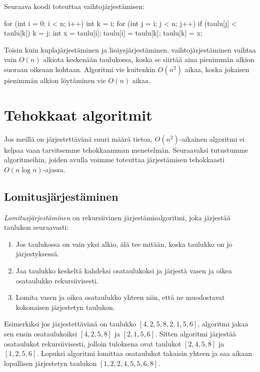 Seuraava koodi toteuttaa vaihtojärjestämisen:

\begin{code}
for (int i = 0; i < n; i++) {
    int k = i;
    for (int j = i; j < n; j++) {
        if (taulu[j] < taulu[k]) k = j;
    }
    int x = taulu[i];
    taulu[i] = taulu[k];
    taulu[k] = x;
}
\end{code}

Toisin kuin kuplajärjestäminen ja lisäysjärjestäminen,
vaihtojärjestäminen vaihtaa vain $O(n)$ alkiota keskenään
taulukossa, koska se siirtää aina pienimmän alkion
suoraan oikeaan kohtaan.
Algoritmi vie kuitenkin $O(n^2)$ aikaa,
koska jokaisen pienimmän alkion löytäminen vie $O(n)$ aikaa.

\section{Tehokkaat algoritmit}

Jos meillä on järjestettävänä suuri määrä tietoa,
$O(n^2)$-aikainen algoritmi ei kelpaa vaan tarvitsemme
tehokkaamman menetelmän.
Seuraavaksi tutustumme algoritmeihin,
joiden avulla voimme toteuttaa järjestämisen tehokkaasti $O(n \log n)$-ajassa.

\subsection{Lomitusjärjestäminen}

\emph{Lomitusjärjestäminen} on rekursiivinen järjestämisalgoritmi,
joka järjestää taulukon seuraavasti:

\begin{enumerate}
\item Jos taulukossa on vain yksi alkio,
älä tee mitään, koska taulukko on jo järjestyksessä.
\item Jaa taulukko keskeltä kahdeksi osataulukoksi ja järjestä
vasen ja oikea osataulukko rekursiivisesti.
\item Lomita vasen ja oikea osataulukko yhteen niin, että ne muodostavat
kokonaisen järjestetyn taulukon.
\end{enumerate}

Esimerkiksi jos järjestettävänä on taulukko $[4,2,5,8,2,1,5,6]$,
algoritmi jakaa sen ensin osataulukoiksi $[4,2,5,8]$ ja $[2,1,5,6]$.
Sitten algoritmi järjestää osataulukot rekursiivisesti,
jolloin tuloksena ovat taulukot $[2,4,5,8]$ ja $[1,2,5,6]$.
Lopuksi algoritmi lomittaa osataulukot takaisin yhteen
ja saa aikaan lopullisen järjestetyn taulukon $[1,2,2,4,5,5,6,8]$.

